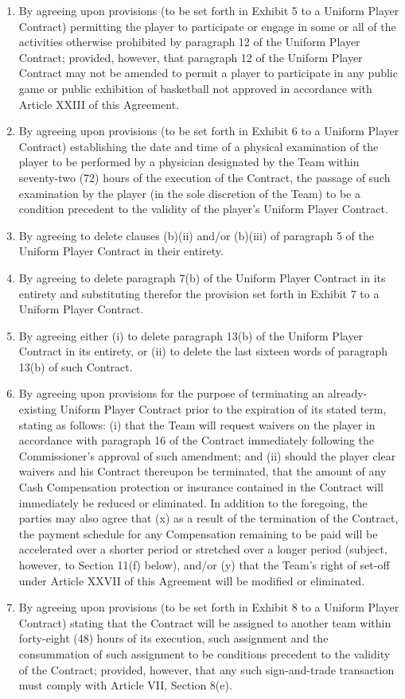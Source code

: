 \documentclass[
]{book}
\begin{document}
\begin{enumerate}
\item
  By agreeing upon provisions (to be set forth in Exhibit 5 to a Uniform Player Contract) permitting the player to participate or engage in some or all of the activities otherwise prohibited by paragraph 12 of the Uniform Player Contract; provided, however, that paragraph 12 of the Uniform Player Contract may not be amended to permit a player to participate in any public game or public exhibition of basketball not approved in accordance with Article XXIII of this Agreement.
\item
  By agreeing upon provisions (to be set forth in Exhibit 6 to a Uniform Player Contract) establishing the date and time of a physical examination of the player to be performed by a physician designated by the Team within seventy-two (72) hours of the execution of the Contract, the passage of such examination by the player (in the sole discretion of the Team) to be a condition precedent to the validity of the player's Uniform Player Contract.
\item
  By agreeing to delete clauses (b)(ii) and/or (b)(iii) of paragraph 5 of the Uniform Player Contract in their entirety.
\item
  By agreeing to delete paragraph 7(b) of the Uniform Player Contract in its entirety and substituting therefor the provision set forth in Exhibit 7 to a Uniform Player Contract.
\item
  By agreeing either (i) to delete paragraph 13(b) of the Uniform Player Contract in its entirety, or (ii) to delete the last sixteen words of paragraph 13(b) of such Contract.
\item
  By agreeing upon provisions for the purpose of terminating an already-existing Uniform Player Contract prior to the expiration of its stated term, stating as follows: (i) that the Team will request waivers on the player in accordance with paragraph 16 of the Contract immediately following the Commissioner's approval of such amendment; and (ii) should the player clear waivers and his Contract thereupon be terminated, that the amount of any Cash Compensation protection or insurance contained in the Contract will immediately be reduced or eliminated. In addition to the foregoing, the parties may also agree that (x) as a result of the termination of the Contract, the payment schedule for any Compensation remaining to be paid will be accelerated over a shorter period or stretched over a longer period (subject, however, to Section 11(f) below), and/or (y) that the Team's right of set-off under Article XXVII of this Agreement will be modified or eliminated.
\item
  By agreeing upon provisions (to be set forth in Exhibit 8 to a Uniform Player Contract) stating that the Contract will be assigned to another team within forty-eight (48) hours of its execution, such assignment and the consummation of such assignment to be conditions precedent to the validity of the Contract; provided, however, that any such sign-and-trade transaction must comply with Article VII, Section 8(e).
\end{enumerate}
\end{document}
